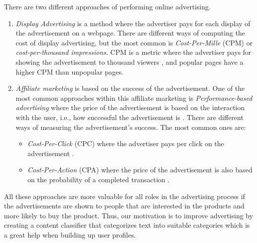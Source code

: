 There are two different approaches of performing online advertising. %
\begin{enumerate}
\item \emph{Display Advertising} is a method where the advertiser pays for each display of the advertisement on a webpage. There are different ways of computing the cost of display advertising, but the most common is \emph{Cost-Per-Mille} (CPM) or \emph{cost-per-thousand impressions}. CPM is a metric where the advertiser pays for showing the advertisement to thousand viewers \cite{costperthousandimpressions}, and popular pages have a higher CPM than unpopular pages. 
\item \emph{Affiliate marketing} is based on the success of the advertisement. One of the most common approaches within this affiliate marketing is  \emph{Performance-based advertising} where the price of the advertisement is based on the interaction with the user, i.e., how successful the advertisement is 
\cite{performancebasedad}. There are different ways of measuring the advertisement's success. The most common ones are:
\begin{itemize}
\item \emph{Cost-Per-Click} (CPC) where the advertiser pays per click on the advertisement \cite{costperclick}.
\item \emph{Cost-Per-Action} (CPA) where the price of the advertisement is also based on the probability of a completed transaction \cite{costperaction}.
\end{itemize}
\end{enumerate}


All these approaches are more valuable for all roles in the advertising process if the advertisements are shown to people that are interested in the products and more likely to buy the product. Thus, our motivation is to improve advertising by creating a content classifier that categorizes text into suitable categories which is a great help when building up user profiles.

